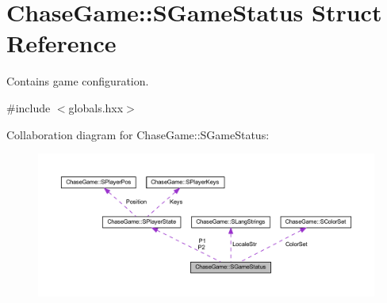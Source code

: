 \hypertarget{struct_chase_game_1_1_s_game_status}{\section{Chase\-Game\-:\-:S\-Game\-Status Struct Reference}
\label{struct_chase_game_1_1_s_game_status}
}


Contains game configuration.  




{\ttfamily \#include $<$globals.\-hxx$>$}



Collaboration diagram for Chase\-Game\-:\-:S\-Game\-Status\-:\nopagebreak
\begin{figure}[H]
\begin{center}
\leavevmode
\includegraphics[width=350pt]{struct_chase_game_1_1_s_game_status__coll__graph}
\end{center}
\end{figure}
